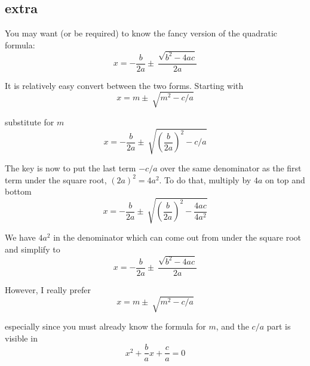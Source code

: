 \documentclass[11pt, oneside]{article}
\begin{document}
\subsection*{extra}

You may want (or be required) to know the fancy version of the quadratic formula:
\[ x = -\frac{b}{2a} \pm \ \frac{\sqrt{b^2 - 4ac}}{2a} \]

It is relatively easy convert between the two forms.  Starting with
\[ x = m \pm \ \sqrt{m^2 - c/a} \]

substitute for $m$
\[ x = - \frac{b}{2a} \pm \ \sqrt{(\frac{b}{2a})^2 - c/a} \]

The key is now to put the last term $-c/a$ over the same denominator as the first term under the square root, $(2a)^2 = 4a^2$.  To do that, multiply by $4a$ on top and bottom
\[ x = - \frac{b}{2a} \pm \ \sqrt{(\frac{b}{2a})^2 - \frac{4ac}{4a^2}} \]

We have $4a^2$ in the denominator which can come out from under the square root and simplify to
\[ x = - \frac{b}{2a} \pm \ \frac{\sqrt{b^2 - 4ac}}{2a}  \]

However, I really prefer
\[ x = m \pm \ \sqrt{m^2 - c/a} \]

especially since you must already know the formula for $m$, and the $c/a$ part is visible in
\[ x^2 + \frac{b}{a} x + \frac{c}{a} =  0 \]
\end{document}
